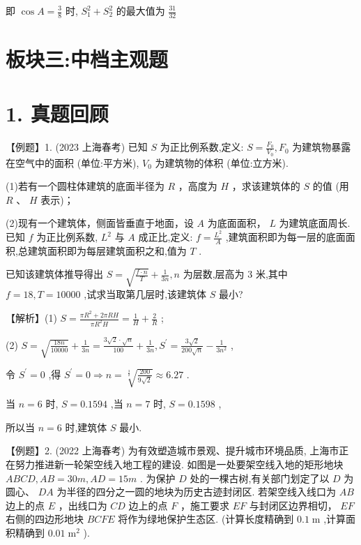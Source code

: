 \documentclass[10pt]{article}
\begin{document}
即 \(\cos A = \frac{3}{8}\) 时, \({S}_{1}^{2} + {S}_{2}^{2}\) 的最大值为 \(\frac{31}{32}\)

\section*{板块三:中档主观题}

\section*{1. 真题回顾}

【例题】1. (2023 上海春考) 已知 \(S\) 为正比例系数,定义: \(S = \frac{{F}_{0}}{{V}_{0}},{F}_{0}\) 为建筑物暴露在空气中的面积 (单位:平方米), \({V}_{0}\) 为建筑物的体积 (单位:立方米).

(1)若有一个圆柱体建筑的底面半径为 \(R\) ，高度为 \(H\) ，求该建筑体的 \(S\) 的值 (用 \(R\) 、 \(H\) 表示)；

(2)现有一个建筑体，侧面皆垂直于地面，设 \(A\) 为底面面积， \(L\) 为建筑底面周长. 已知 \(f\) 为正比例系数, \({L}^{2}\) 与 \(A\) 成正比,定义: \(f = \frac{{L}^{2}}{A}\) ,建筑面积即为每一层的底面面积,总建筑面积即为每层建筑面积之和,值为 \(T\) .

已知该建筑体推导得出 \(S = \sqrt{\frac{f \cdot  n}{T}} + \frac{1}{3n},n\) 为层数,层高为 3 米,其中 \(f = {18},T = {10000}\) ,试求当取第几层时,该建筑体 \(S\) 最小?

【解析】(1) \(S = \frac{\pi {R}^{2} + {2\pi RH}}{\pi {R}^{2}H} = \frac{1}{H} + \frac{2}{R}\) ;

(2) \(S = \sqrt{\frac{18n}{10000}} + \frac{1}{3n} = \frac{3\sqrt{2} \cdot  \sqrt{n}}{100} + \frac{1}{3n},{S}^{\prime } = \frac{3\sqrt{2}}{{200}\sqrt{n}} - \frac{1}{3{n}^{2}}\) ,

令 \({S}^{\prime } = 0\) ,得 \({S}^{\prime } = 0 \Rightarrow  n = \sqrt[\frac{3}{2}]{\frac{200}{9\sqrt{2}}} \approx  {6.27}\) .

当 \(n = 6\) 时, \(S = {0.1594}\) ,当 \(n = 7\) 时, \(S = {0.1598}\) ,

所以当 \(n = 6\) 时,建筑体 \(S\) 最小.

【例题】2. (2022 上海春考) 为有效塑造城市景观、提升城市环境品质, 上海市正在努力推进新一轮架空线入地工程的建设. 如图是一处要架空线入地的矩形地块 \({ABCD},{AB} = {30m},{AD} = {15m}\) . 为保护 \(D\) 处的一棵古树,有关部门划定了以 \(D\) 为圆心、 \({DA}\) 为半径的四分之一圆的地块为历史古迹封闭区. 若架空线入线口为 \({AB}\) 边上的点 \(E\) ，出线口为 \({CD}\) 边上的点 \(F\) ，施工要求 \({EF}\) 与封闭区边界相切， \({EF}\) 右侧的四边形地块 \({BCFE}\) 将作为绿地保护生态区. (计算长度精确到 \({0.1}\mathrm{\;m}\) ,计算面积精确到 \({0.01}{\mathrm{\;m}}^{2}\) ).
\end{document}
